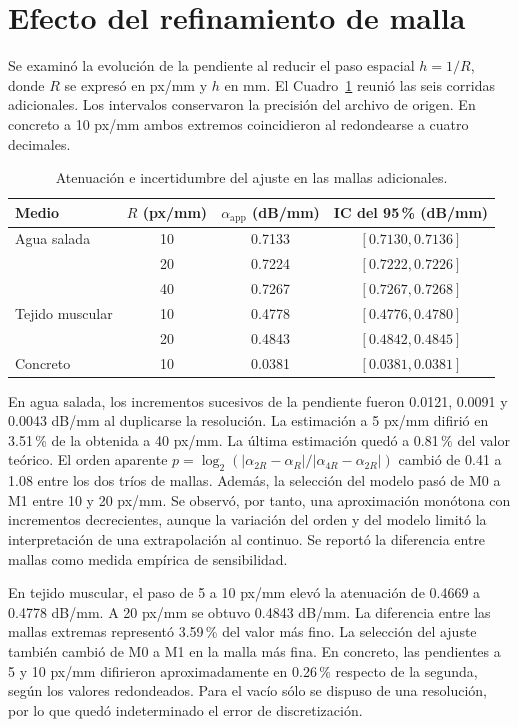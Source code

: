 \section{Efecto del refinamiento de malla}
Se examinó la evolución de la pendiente al reducir el paso espacial $h=1/R$, donde $R$ se expresó en px/mm y $h$ en mm. El Cuadro~\ref{tab:fdtd-mallas} reunió las seis corridas adicionales. Los intervalos conservaron la precisión del archivo de origen. En concreto a 10 px/mm ambos extremos coincidieron al redondearse a cuatro decimales.
\begin{table}[htbp]\centering\small\caption{Atenuación e incertidumbre del ajuste en las mallas adicionales.}\label{tab:fdtd-mallas}
\begin{tabular}{lccc}\hline Medio & $R$ (px/mm) & $\alpha_{\mathrm{app}}$ (dB/mm) & IC del 95\,\% (dB/mm) \\ \hline
Agua salada & 10 & 0.7133 & $[0.7130,0.7136]$ \\ & 20 & 0.7224 & $[0.7222,0.7226]$ \\ & 40 & 0.7267 & $[0.7267,0.7268]$ \\
Tejido muscular & 10 & 0.4778 & $[0.4776,0.4780]$ \\ & 20 & 0.4843 & $[0.4842,0.4845]$ \\
Concreto & 10 & 0.0381 & $[0.0381,0.0381]$ \\ \hline\end{tabular}\end{table}

En agua salada, los incrementos sucesivos de la pendiente fueron 0.0121, 0.0091 y 0.0043 dB/mm al duplicarse la resolución. La estimación a 5 px/mm difirió en 3.51\,\% de la obtenida a 40 px/mm. La última estimación quedó a 0.81\,\% del valor teórico. El orden aparente $p=\log_2(|\alpha_{2R}-\alpha_R|/|\alpha_{4R}-\alpha_{2R}|)$ cambió de 0.41 a 1.08 entre los dos tríos de mallas. Además, la selección del modelo pasó de M0 a M1 entre 10 y 20 px/mm. Se observó, por tanto, una aproximación monótona con incrementos decrecientes, aunque la variación del orden y del modelo limitó la interpretación de una extrapolación al continuo. Se reportó la diferencia entre mallas como medida empírica de sensibilidad.

En tejido muscular, el paso de 5 a 10 px/mm elevó la atenuación de 0.4669 a 0.4778 dB/mm. A 20 px/mm se obtuvo 0.4843 dB/mm. La diferencia entre las mallas extremas representó 3.59\,\% del valor más fino. La selección del ajuste también cambió de M0 a M1 en la malla más fina. En concreto, las pendientes a 5 y 10 px/mm difirieron aproximadamente en 0.26\,\% respecto de la segunda, según los valores redondeados. Para el vacío sólo se dispuso de una resolución, por lo que quedó indeterminado el error de discretización.

